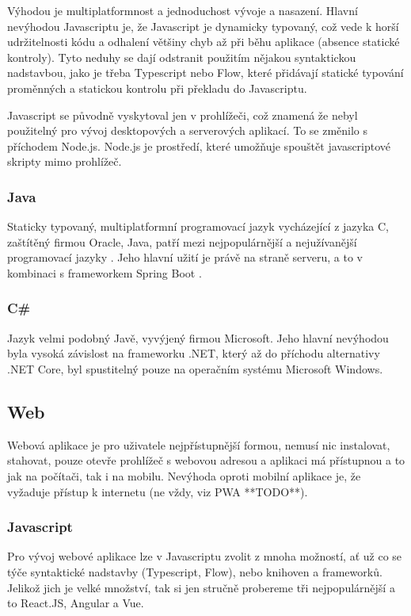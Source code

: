 Výhodou je multiplatformnost a jednoduchost vývoje a nasazení. Hlavní nevýhodou Javascriptu je, že Javascript je dynamicky typovaný, což vede k horší udržitelnosti kódu a odhalení většiny chyb až při běhu aplikace (absence statické kontroly). Tyto neduhy se dají odstranit použitím nějakou syntaktickou nadstavbou, jako je třeba Typescript nebo Flow, které přidávají statické typování proměnných a statickou kontrolu při překladu do Javascriptu.

Javascript se původně vyskytoval jen v prohlížeči, což znamená že nebyl použitelný pro vývoj desktopových a serverových aplikací. To se změnilo s příchodem Node.js. Node.js je prostředí, které umožňuje spouštět javascriptové skripty mimo prohlížeč.

\subsubsection{Java}
Staticky typovaný, multiplatformní programovací jazyk vycházející z jazyka C, zaštítěný firmou Oracle, Java, patří mezi nejpopulárnější a nejužívanější programovací jazyky \cite{stackexchangeinc_2019_stack} . Jeho hlavní užití je právě na straně serveru, a to v kombinaci s frameworkem Spring Boot \cite{jetbrainssro_2019_demographics} .

\subsubsection{C\# }
Jazyk velmi podobný Javě, vyvýjený firmou Microsoft. Jeho hlavní nevýhodou byla vysoká závislost na frameworku .NET, který až do příchodu alternativy .NET Core, byl spustitelný pouze na operačním systému Microsoft Windows.

\subsection{Web}
\label{ss:web}
Webová aplikace je pro uživatele nejpřístupnější formou, nemusí nic instalovat, stahovat, pouze otevře prohlížeč s webovou adresou a aplikaci má přístupnou a to jak na počítači, tak i na mobilu. Nevýhoda oproti mobilní aplikace je, že vyžaduje přístup k internetu (ne vždy, viz PWA **TODO**).

\subsubsection{Javascript}
Pro vývoj webové aplikace lze v Javascriptu zvolit z mnoha možností, ať už co se týče syntaktické nadstavby (Typescript, Flow), nebo knihoven a frameworků. Jelikož jich je velké množství, tak si jen stručně probereme tři nejpopulárnější a to React.JS, Angular a Vue.

